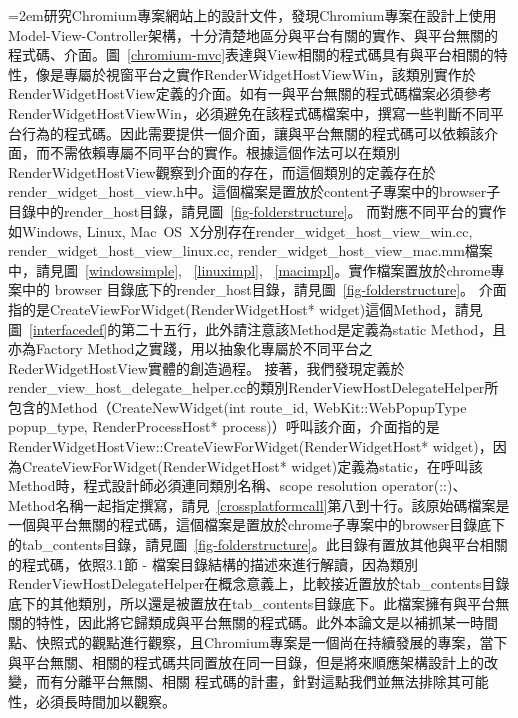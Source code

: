 \documentclass[10pt, twocolumn]{article}
\begin{document}

\parindent=2em研究Chro\-mium專案網站上的設計文件\cite{chromiummvc}，發現Chro\-mium專案在設計上使用Model-View-Controller架構\cite{modelviewcontroller}，十分清楚地區分與平台有關的實作、與平台無關的程式碼、介面。圖~\ref{chromium-mvc}表達與View相關的程式碼具有與平台相關的特性，像是專屬於視窗平台之實作Render\-Widget\-Host\-View\-Win，該類別實作於Render\-Widget\-Host\-View定義的介面。如有一與平台無關的程式碼檔案必須參考Render\-Widget\-Host\-View\-Win，必須避免在該程式碼檔案中，撰寫一些判斷不同平台行為的程式碼。因此需要提供一個介面，讓與平台無關的程式碼可以依賴該介面，而不需依賴專屬不同平台的實作。根據這個作法可以在類別Render\-Widget\-Host\-View觀察到介面的存在，而這個類別的定義存在於render\_widget\_host\_view.h中。這個檔案是置放於content子專案中的browser子目錄中的render\_host目錄，請見圖~\ref{fig-folderstructure}。
而對應不同平台的實作如Windows, Linux, Mac\-\ OS\-\ X分別存在render\_\-widget\_\-host\_\-view\_\-win.cc, render\_\-widget\_\-host\_\-view\_\-linux.cc, render\_\-widget\_\-host\_\-view\_\-mac.mm檔案中，請見圖~\ref{windowsimple}, ~\ref{linuximpl}, ~\ref{macimpl}。實作檔案置放於chrome專案中的 browser 目錄底下的render\_host目錄，請見圖~\ref{fig-folderstructure}。
介面指的是Create\-View\-For\-Widget\-(Render\-Widget\-Host* widget)這個Method，請見圖~\ref{interfacedef}的第二十五行，此外請注意該Method是定義為static Method，且亦為Factory Method之實踐\cite{gofdesignpattern}，用以抽象化專屬於不同平台之RederWidgetHostView實體的創造過程。
接著，我們發現定義於render\_view\_host\_delegate\_helper.cc的類別Render\-View\-Host\-Delegate\-Helper所包含的Method（Create\-New\-Widget(int route\_id, WebKit::Web\-Popup\-Type popup\_type, Render\-Process\-Host* process)）呼叫該介面，介面指的是Render\-Widget\-HostView::Create\-View\-For\-Widget\-(Render\-Widget\-Host* widget)，因為CreateViewForWidget(RenderWidgetHost* widget)定義為static，在呼叫該Method時，程式設計師必須連同類別名稱、scope resolution operator(::)、Method名稱一起指定撰寫，請見~\ref{crossplatformcall}第八到十行。該原始碼檔案是一個與平台無關的程式碼，這個檔案是置放於chrome子專案中的browser目錄底下的tab\_contents目錄，請見圖~\ref{fig-folderstructure}。此目錄有置放其他與平台相關的程式碼，依照3.1節 - 檔案目錄結構的描述來進行解讀，因為類別Render\-View\-Host\-Delegate\-Helper在概念意義上，比較接近置放於tab\_contents目錄底下的其他類別，所以還是被置放在tab\_contents目錄底下。此檔案擁有與平台無關的特性，因此將它歸類成與平台無關的程式碼。此外本論文是以補抓某一時間點、快照式的觀點進行觀察，且Chromium專案是一個尚在持續發展的專案，當下與平台無關、相關的程式碼共同置放在同一目錄，但是將來順應架構設計上的改變，而有分離平台無關、相關
程式碼的計畫，針對這點我們並無法排除其可能性，必須長時間加以觀察。
\end{document}
